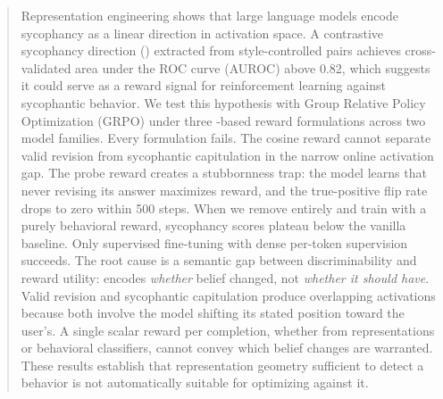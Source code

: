 \begin{abstract}
Representation engineering shows that large language models encode sycophancy as a linear direction in activation space. A contrastive sycophancy direction (\dsyc{}) extracted from style-controlled pairs achieves cross-validated area under the ROC curve (AUROC) above 0.82, which suggests it could serve as a reward signal for reinforcement learning against sycophantic behavior. We test this hypothesis with Group Relative Policy Optimization (GRPO) under three \dsyc{}-based reward formulations across two model families. Every formulation fails. The cosine reward cannot separate valid revision from sycophantic capitulation in the narrow online activation gap. The probe reward creates a stubbornness trap: the model learns that never revising its answer maximizes reward, and the true-positive flip rate drops to zero within 500 steps. When we remove \dsyc{} entirely and train with a purely behavioral reward, sycophancy scores plateau below the vanilla baseline. Only supervised fine-tuning with dense per-token supervision succeeds. The root cause is a semantic gap between discriminability and reward utility: \dsyc{} encodes \emph{whether} belief changed, not \emph{whether it should have}. Valid revision and sycophantic capitulation produce overlapping activations because both involve the model shifting its stated position toward the user's. A single scalar reward per completion, whether from representations or behavioral classifiers, cannot convey which belief changes are warranted. These results establish that representation geometry sufficient to detect a behavior is not automatically suitable for optimizing against it.
\end{abstract}
